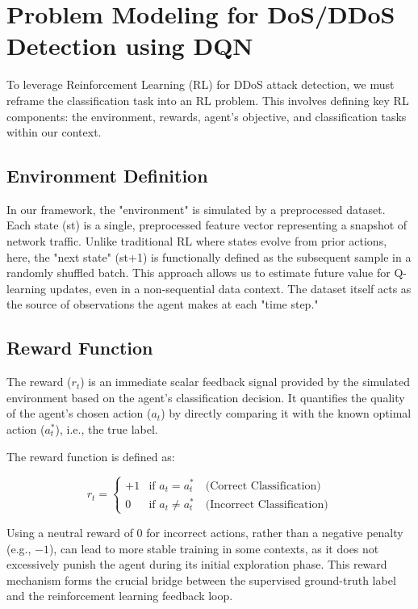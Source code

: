 \documentclass[12pt]{report}
\begin{document}
\section{Problem Modeling for DoS/DDoS Detection using DQN}

To leverage Reinforcement Learning (RL) for DDoS attack detection, we must reframe the classification task into an RL problem. This involves defining key RL components: the environment, rewards, agent's objective, and classification tasks within our context.

\subsection{Environment Definition}
In our framework, the "environment" is simulated by a preprocessed dataset. Each state (st​) is a single, preprocessed feature vector representing a snapshot of network traffic. Unlike traditional RL where states evolve from prior actions, here, the "next state" (st+1​) is functionally defined as the subsequent sample in a randomly shuffled batch. This approach allows us to estimate future value for Q-learning updates, even in a non-sequential data context. The dataset itself acts as the source of observations the agent makes at each "time step."

\subsection{Reward Function}

The reward ($r_t$) is an immediate scalar feedback signal provided by the simulated environment based on the agent's classification decision. It quantifies the quality of the agent’s chosen action ($a_t$) by directly comparing it with the known optimal action ($a_t^*$), i.e., the true label.

The reward function is defined as:

\[
r_t =
\begin{cases}
+1 & \text{if } a_t = a_t^* \quad \text{(Correct Classification)} \\
0   & \text{if } a_t \ne a_t^* \quad \text{(Incorrect Classification)}
\end{cases}
\]

Using a neutral reward of 0 for incorrect actions, rather than a negative penalty (e.g., $-1$), can lead to more stable training in some contexts, as it does not excessively punish the agent during its initial exploration phase. This reward mechanism forms the crucial bridge between the supervised ground-truth label and the reinforcement learning feedback loop.
\end{document}
